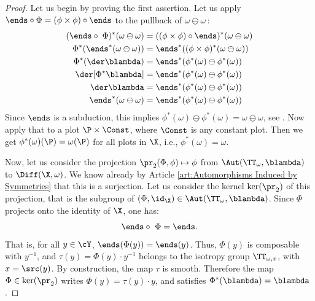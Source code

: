   \begin{proof}
    Let us begin by proving the first assertion.
    Let us apply $\ends \circ \Phi = (\phi \times \phi) \circ \ends$ to the pullback of $\omega \ominus \omega$\,:
    \begin{align*}
      (\ends \circ\; \Phi)^*(\omega \ominus \omega) & = ((\phi \times \phi) \circ \ends)^*(\omega \ominus \omega) \\
      \Phi^*(\ends^*(\omega \ominus \omega)) & = \ends^*((\phi \times \phi)^*(\omega \ominus \omega)) \\
      \Phi^*(\der\blambda) & = \ends^*(\phi^*(\omega) \ominus \phi^*(\omega)) \\
      \der[\Phi^*\blambda] & = \ends^*(\phi^*(\omega) \ominus \phi^*(\omega)) \\
      \der\blambda & = \ends^*(\phi^*(\omega) \ominus \phi^*(\omega)) \\
      \ends^*(\omega \ominus \omega) & = \ends^*(\phi^*(\omega) \ominus \phi^*(\omega))
    \end{align*}
    Since $\ends$ is a subduction,
    this implies $\phi^*(\omega) \ominus \phi^*(\omega) = \omega \ominus \omega$,
    see \cite[]{PIZ13}.
    Now apply that to a plot $\P \times \Const$,
    where $\Const$ is any constant plot.
    Then we get $\phi^*(\omega)(\P) = \omega(\P)$ for all plots in $\X$,
    i.e.,
    $\phi^*(\omega) = \omega$.
    
    Now,
    let us consider the projection $\pr_2 (\Phi,\phi) \mapsto \phi$ from $\Aut(\TT_\omega,\blambda)$ to $\Diff(\X,\omega)$.
    We know already by Article \ref{art:Automorphisms Induced by Symmetries} that this is a surjection.
    Let us consider the kernel $\ker(\pr_2)$ of this projection,
    that is the subgroup of $(\Phi,\id_\X) \in \Aut(\TT_\omega,\blambda)$.
    Since $\Phi$ projects onto the identity of $\X$,
    one has:
    $$
      \ends \circ\ \Phi = \ends.
      $$
    That is,
    for all $y \in \cY$,
    $\ends(\Phi(y)) = \ends(y)$.
    Thus,
    $\Phi(y)$ is composable with $y^{-1}$,
    and $\tau(y) = \Phi(y) \cdot y^{-1}$ belongs to the isotropy group $\TT_{\omega,x}$,
    with $x = \src(y)$.
    By construction,
    the map $\tau$ is smooth.
    Therefore the map $\Phi \in \ker(\pr_2)$ writes $\Phi(y) = \tau(y) \cdot y$,
    and satisfies $\Phi^*(\blambda) = \blambda$.
    

\end{proof}

